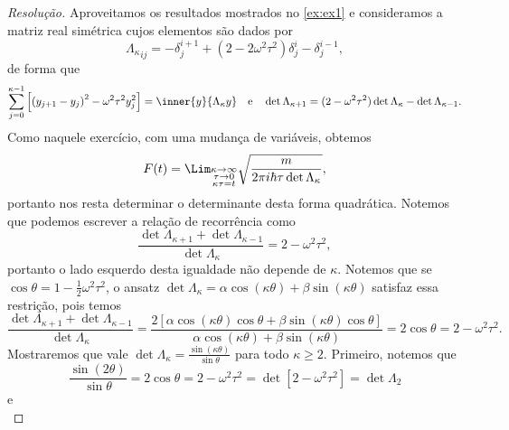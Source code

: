 \begin{proof}[Resolução]
   Aproveitamos os resultados mostrados no \cref{ex:ex1} e consideramos a matriz real simétrica cujos elementos são dados por
   \begin{equation*}
      {\Lambda_{\kappa}}_{ij} = -\delta^{i+1}_j + (2 - 2 \omega^2 \tau^2) \delta^{i}_j - \delta^{i -1}_j,
   \end{equation*}
   de forma que
   \begin{equation*}
      \sum_{j = 0}^{\kappa - 1} \left[\left(y_{j+1} - y_j\right)^2 - \omega^2\tau^2 y_j^2\right] = \inner{y}{\Lambda_{\kappa} y}
      \quad\text{e}\quad
      \det{\Lambda_{\kappa + 1}} = (2 - \omega^2 \tau^2) \det{\Lambda_{\kappa}} - \det{\Lambda_{\kappa - 1}}.
   \end{equation*}
   Como naquele exercício, com uma mudança de variáveis, obtemos
   \begin{equation*}
      F(t) = \Lim_{\substack{\kappa \to \infty\\ \tau \to 0\\ \kappa \tau = t}}{\sqrt{\frac{m}{2\pi i \hbar \tau \det \Lambda_{\kappa}}}},
   \end{equation*}
   portanto nos resta determinar o determinante desta forma quadrática. Notemos que podemos escrever a relação de recorrência como
   \begin{equation*}
      \frac{\det{\Lambda_{\kappa+1}} + \det{\Lambda_{\kappa - 1}}}{\det{\Lambda_{\kappa}}} = 2 - \omega^2 \tau^2,
   \end{equation*}
   portanto o lado esquerdo desta igualdade não depende de \(\kappa.\) Notemos que se \(\cos\theta = 1 - \frac12 \omega^2 \tau^2\), o ansatz \(\det{\Lambda_{\kappa}} = \alpha \cos(\kappa \theta) + \beta \sin(\kappa \theta)\) satisfaz essa restrição, pois temos
   \begin{equation*}
      \frac{\det{\Lambda_{\kappa+1}} + \det{\Lambda_{\kappa - 1}}}{\det{\Lambda_{\kappa}}} = \frac{2\left[\alpha \cos(\kappa \theta) \cos\theta + \beta \sin(\kappa \theta) \cos \theta\right]}{\alpha \cos(\kappa \theta) + \beta \sin (\kappa \theta)} = 2 \cos\theta = 2 - \omega^2 \tau^2.
   \end{equation*}
   Mostraremos que vale \(\det\Lambda_{\kappa} = \frac{\sin(\kappa \theta)}{\sin\theta}\) para todo \(\kappa \geq 2.\) Primeiro, notemos que
   \begin{equation*}
      \frac{\sin(2 \theta)}{\sin\theta} = 2\cos\theta = 2 - \omega^2 \tau^2 = \det[2 - \omega^2 \tau^2] = \det{\Lambda_{2}}
   \end{equation*}
   e
   \begin{equation*}

\end{equation*}
\end{proof}
